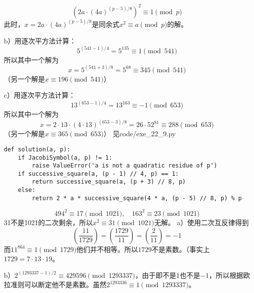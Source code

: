 \[\left(2a\cdot (4a)^{(p-5)/8}\right)^2\equiv 1\pmod p\]
此时，$x=2a\cdot (4a)^{(p-5)/8}$是同余式$x^2\equiv a\pmod p$的解。\par
b）用逐次平方法计算：
\[5^{(541-1)/4}=5^{135}\equiv1\pmod{541}\]
所以其中一个解为
\[x=5^{(541+3)/8}=5^{68}\equiv345\pmod{541}\]
（另一个解是$x\equiv 196\pmod{541}$）\par
c）用逐次平方法计算：
\[13^{(653-1)/4}=13^{163}\equiv-1\pmod{653}\]
所以其中一个解为
\[x=2\cdot13\cdot(4\cdot13)^{(653-3)/8}=26\cdot52^{81}\equiv288\pmod{653}\]
（另一个解是$x\equiv 365\pmod{653}$）
%
\exercise 见code/exe\_22\_9.py
\begin{lstlisting}
def solution(a, p):
    if JacobiSymbol(a, p) != 1:
        raise ValueError('a is not a quadratic residue of p')
    if successive_square(a, (p - 1) // 4, p) == 1:
        return successive_square(a, (p + 3) // 8, p)
    else:
        return 2 * a * successive_square(4 * a, (p - 5) // 8, p) % p
\end{lstlisting}
\[494^2\equiv 17\pmod{1021},\quad 163^2\equiv 23\pmod{1021}\]
31不是1021的二次剩余，所以$x^2\equiv 31\pmod{1021}$无解。
%
\exercise a）使用二次互反律得到
\[\left(\frac{11}{1729}\right)=\left(\frac{1729}{11}\right)=\left(\frac{2}{11}\right)=-1\]
而$11^{864}\equiv 1\pmod{1729}$他们并不相等。所以$1729$不是素数。（事实上$1729=7\cdot13\cdot19$。\par
b）$2^{(1293337 - 1)/2}\equiv429596\pmod{1293337}$，由于即不是1也不是$-1$，所以根据欧拉准则可以断定他不是素数。虽然$2^{1293336}\equiv1\pmod{1293337}$。